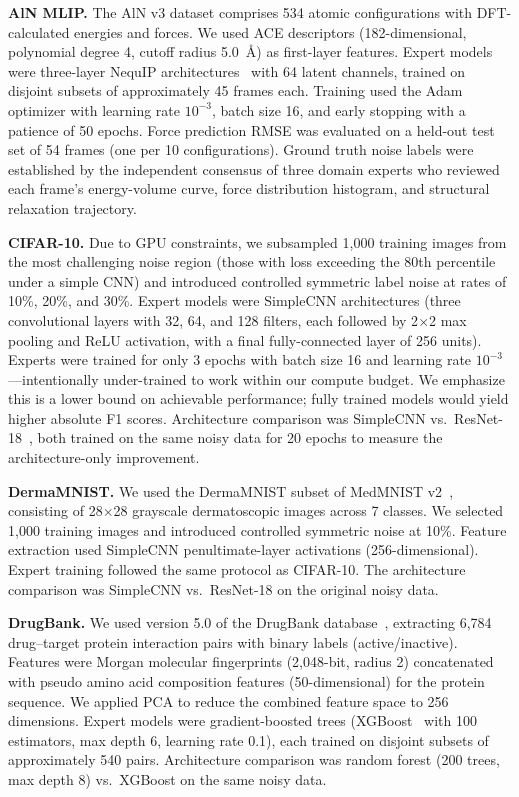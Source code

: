 \textbf{AlN MLIP.} The AlN v3 dataset comprises 534 atomic configurations with DFT-calculated energies and forces. We used ACE descriptors (182-dimensional, polynomial degree 4, cutoff radius 5.0~\AA) as first-layer features. Expert models were three-layer NequIP architectures~\cite{batzner2022e3nn} with 64 latent channels, trained on disjoint subsets of approximately 45 frames each. Training used the Adam optimizer with learning rate $10^{-3}$, batch size 16, and early stopping with a patience of 50 epochs. Force prediction RMSE was evaluated on a held-out test set of 54 frames (one per 10 configurations). Ground truth noise labels were established by the independent consensus of three domain experts who reviewed each frame's energy-volume curve, force distribution histogram, and structural relaxation trajectory.

\textbf{CIFAR-10.} Due to GPU constraints, we subsampled 1,000 training images from the most challenging noise region (those with loss exceeding the 80th percentile under a simple CNN) and introduced controlled symmetric label noise at rates of 10\%, 20\%, and 30\%. Expert models were SimpleCNN architectures (three convolutional layers with 32, 64, and 128 filters, each followed by 2$\times$2 max pooling and ReLU activation, with a final fully-connected layer of 256 units). Experts were trained for only 3 epochs with batch size 16 and learning rate $10^{-3}$---intentionally under-trained to work within our compute budget. We emphasize this is a lower bound on achievable performance; fully trained models would yield higher absolute F1 scores. Architecture comparison was SimpleCNN vs.\ ResNet-18~\cite{he2016deep}, both trained on the same noisy data for 20 epochs to measure the architecture-only improvement.

\textbf{DermaMNIST.} We used the DermaMNIST subset of MedMNIST v2~\cite{yang2023medmnist}, consisting of 28$\times$28 grayscale dermatoscopic images across 7 classes. We selected 1,000 training images and introduced controlled symmetric noise at 10\%. Feature extraction used SimpleCNN penultimate-layer activations (256-dimensional). Expert training followed the same protocol as CIFAR-10. The architecture comparison was SimpleCNN vs.\ ResNet-18 on the original noisy data.

\textbf{DrugBank.} We used version 5.0 of the DrugBank database~\cite{wishart2018drugbank}, extracting 6,784 drug--target protein interaction pairs with binary labels (active/inactive). Features were Morgan molecular fingerprints (2,048-bit, radius 2) concatenated with pseudo amino acid composition features (50-dimensional) for the protein sequence. We applied PCA to reduce the combined feature space to 256 dimensions. Expert models were gradient-boosted trees (XGBoost~\cite{chen2016xgboost} with 100 estimators, max depth 6, learning rate 0.1), each trained on disjoint subsets of approximately 540 pairs. Architecture comparison was random forest (200 trees, max depth 8) vs.\ XGBoost on the same noisy data.

